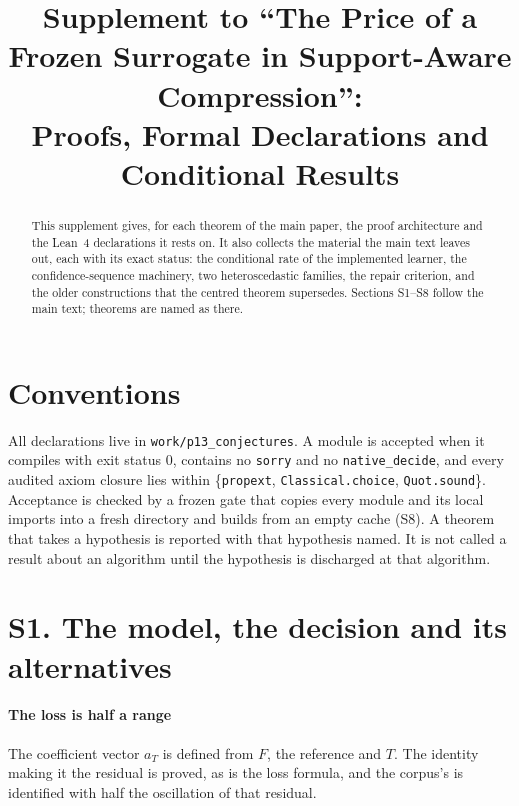 



\title{Supplement to ``The Price of a Frozen Surrogate in Support-Aware Compression'':\\
Proofs, Formal Declarations and Conditional Results}

\author{
}

\maketitle

\begin{abstract}
This supplement gives, for each theorem of the main paper, the proof architecture and the
Lean~4 declarations it rests on. It also collects the material the main text leaves out, each
with its exact status: the conditional rate of the implemented learner, the confidence-sequence
machinery, two heteroscedastic families, the repair criterion, and the older constructions that
the centred theorem supersedes. Sections S1--S8 follow the main text; theorems are named as
there.
\end{abstract}

\section*{Conventions}

All declarations live in \texttt{work/p13\_conjectures}. A module is accepted when it compiles
with exit status $0$, contains no \texttt{sorry} and no \texttt{native\_decide}, and every audited
axiom closure lies within \{\texttt{propext}, \texttt{Classical.choice}, \texttt{Quot.sound}\}.
Acceptance is checked by a frozen gate that copies every module and its local imports into a
fresh directory and builds from an empty cache (S8). A theorem that takes a hypothesis is
reported with that hypothesis named. It is not called a result about an algorithm until the
hypothesis is discharged at that algorithm.

\section{S1. The model, the decision and its alternatives}

\paragraph{The loss is half a range} The coefficient vector $a_{T}$ is defined from $F$, the
reference and $T$. The identity making it the residual is proved, as is the loss formula, and
the corpus's  is identified with half the oscillation of that residual.

